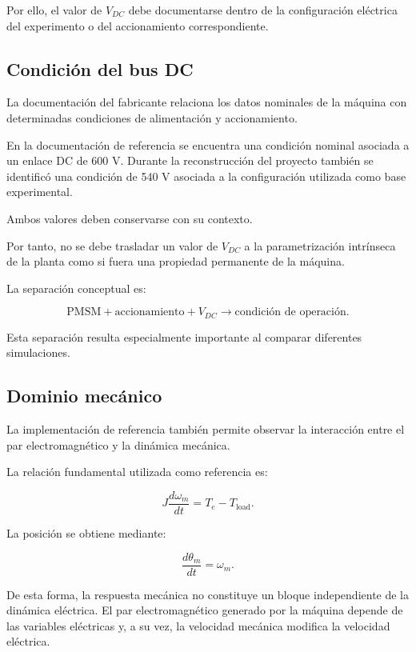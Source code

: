 Por ello, el valor de $V_{DC}$ debe documentarse dentro de la configuración eléctrica del experimento o del accionamiento correspondiente.

\subsection{Condición del bus DC}

La documentación del fabricante relaciona los datos nominales de la máquina con determinadas condiciones de alimentación y accionamiento.

En la documentación de referencia se encuentra una condición nominal asociada a un enlace DC de 600 V. Durante la reconstrucción del proyecto también se identificó una condición de 540 V asociada a la configuración utilizada como base experimental.

Ambos valores deben conservarse con su contexto.

Por tanto, no se debe trasladar un valor de $V_{DC}$ a la parametrización intrínseca de la planta como si fuera una propiedad permanente de la máquina.

La separación conceptual es:

\begin{equation}
\text{PMSM}
+
\text{accionamiento}
+
V_{DC}
\rightarrow
\text{condición de operación}.
\end{equation}

Esta separación resulta especialmente importante al comparar diferentes simulaciones.

\subsection{Dominio mecánico}

La implementación de referencia también permite observar la interacción entre el par electromagnético y la dinámica mecánica.

La relación fundamental utilizada como referencia es:

\begin{equation}
J\frac{d\omega_m}{dt}
=
T_e-T_{\mathrm{load}}.
\end{equation}

La posición se obtiene mediante:

\begin{equation}
\frac{d\theta_m}{dt}
=
\omega_m.
\end{equation}

De esta forma, la respuesta mecánica no constituye un bloque independiente de la dinámica eléctrica. El par electromagnético generado por la máquina depende de las variables eléctricas y, a su vez, la velocidad mecánica modifica la velocidad eléctrica.


